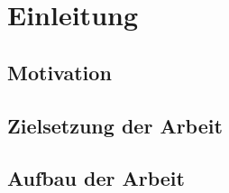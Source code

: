\thispagestyle{plain}
\chapter{Einleitung}
\section{Motivation}

\section{Zielsetzung der Arbeit}

\section{Aufbau der Arbeit}
